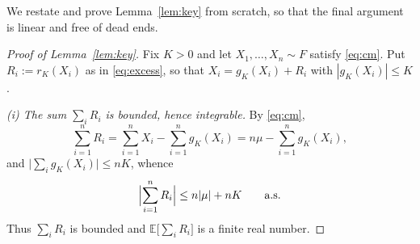 \documentclass{amsart}
\theoremstyle{definition}
\theoremstyle{remark}
\begin{document}
We restate and prove Lemma~\ref{lem:key} from scratch, so that the final argument is linear
and free of dead ends.

\begin{proof}[Proof of Lemma~\ref{lem:key}]
Fix $K>0$ and let $X_1,\dots,X_n\sim F$ satisfy \eqref{eq:cm}. Put $R_i:=r_K(X_i)$ as in
\eqref{eq:excess}, so that $X_i=g_K(X_i)+R_i$ with $|g_K(X_i)|\le K$.

\emph{(i) The sum $\sum_i R_i$ is bounded, hence integrable.}
By \eqref{eq:cm},
\[
\sum_{i=1}^{n}R_i=\sum_{i=1}^{n}X_i-\sum_{i=1}^{n}g_K(X_i)=n\mu-\sum_{i=1}^{n}g_K(X_i),
\]
and $\bigl|\sum_i g_K(X_i)\bigr|\le nK$, whence
\begin{equation}\label{eq:bnd2}
\Bigl|\sum_{i=1}^n R_i\Bigr|\le n|\mu|+nK \qquad\text{a.s.}
\end{equation}
Thus $\sum_i R_i$ is bounded and $\mathbb{E}\bigl[\sum_i R_i\bigr]$ is a finite real number.


\end{proof}
\end{document}
